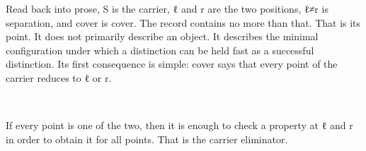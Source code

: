 \documentclass[11pt,a4paper]{book}
\def\texttt#1{#1}%
\begin{document}
Read back into prose, \texttt{S} is the carrier, \texttt{ℓ} and
\texttt{r} are the two positions, \texttt{ℓ≠r} is separation, and
\texttt{cover} is cover. The record contains no more than that. That is
its point. It does not primarily describe an object. It describes the
minimal configuration under which a distinction can be held fast as a
successful distinction. Its first consequence is simple: \texttt{cover}
says that every point of the carrier reduces to \texttt{ℓ} or \texttt{r}.

\begin{code}%
\>[0]\AgdaSpace{}%
\AgdaSymbol{:}\AgdaSpace{}%
\AgdaSymbol{(}\AgdaSpace{}%
\AgdaSymbol{:}\AgdaSpace{}%
\AgdaSymbol{)}\AgdaSpace{}%
\AgdaSpace{}%
\AgdaSymbol{(}\AgdaSpace{}%
\AgdaSymbol{:}\AgdaSpace{}%
\AgdaSpace{}%
\AgdaSymbol{)}\AgdaSpace{}%
\AgdaSpace{}%
\AgdaSymbol{(}\AgdaSpace{}%
\AgdaSpace{}%
\AgdaSpace{}%
\AgdaSymbol{)}\AgdaSpace{}%
\AgdaSpace{}%
\AgdaSymbol{(}\AgdaSpace{}%
\AgdaSpace{}%
\AgdaSpace{}%
\AgdaSymbol{)}\<%
\\
\>[0]\AgdaSpace{}%
\AgdaSymbol{=}\AgdaSpace{}%
\<%
\end{code}

If every point is one of the two, then it is enough to check a property at
\texttt{ℓ} and \texttt{r} in order to obtain it for all points. That is
the carrier eliminator.
\end{document}
